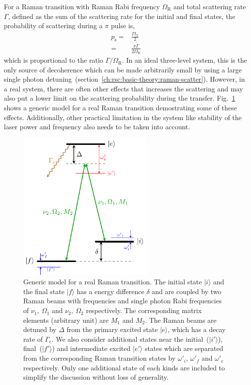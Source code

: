 For a Raman transition with Raman Rabi frequency $\Omega_{\mathrm{R}}$ and total scattering rate
$\Gamma$, defined as the sum of the scattering rate for the initial and final states,
the probability of scattering during a $\pi$ pulse is,
\begin{align*}
  p_{\mathrm{s}}=&\frac{\Gamma t_{\pi}}{2}\\
  =&\frac{\pi\Gamma}{2\Omega_{\mathrm{R}}}
\end{align*}
which is proportional to the ratio $\Gamma/\Omega_{\mathrm{R}}$.
In an ideal three-level system, this is the only source of decoherence
which can be made arbitrarily small by using a large
single photon detuning~(section~\ref{ch:rsc:basic-theory:raman-scatter}).
However, in a real system, there are often other effects that increases the scattering
and may also put a lower limit on the scattering probability during the transfer.
Fig.~\ref{fig:raman-transfer:generic-raman-model} shows a generic model
for a real Raman transition demostrating some of these effects.
Additionally, other practical limitation in the system like stability of the laser power
and frequency also needs to be taken into account.

\begin{figure}
  \centering
  \includegraphics[width=0.6\textwidth]{figures/raman_transfer_generic_raman_model.pdf}
  \caption[Generic model for a real Raman transition]{
    Generic model for a real Raman transition.
    The initial state $|i\rangle$ and the final state $|f\rangle$
    has a energy difference $\delta$
    and are coupled by two Raman beams with frequencies and
    single photon Rabi frequencies of $\nu_1,\ \Omega_1$ and $\nu_2,\ \Omega_2$ respectively.
    The corresponding matrix elements (arbitrary unit) are $M_1$ and $M_2$.
    The Raman beams are detuned by $\Delta$ from the primary excited state $|e\rangle$,
    which has a decay rate of $\Gamma_e$.
    We also consider additional states near the initial~($|i'\rangle$),
    final~($|f'\rangle$) and intermediate excited $|e'\rangle$ states which are
    separated from the corresponding Raman transition states by $\omega'_i$,
    $\omega'_f$ and $\omega'_e$ respectively.
    Only one additional state of each kinds are included to simplify the discussion
    without loss of generality.
    \label{fig:raman-transfer:generic-raman-model}}
\end{figure}

